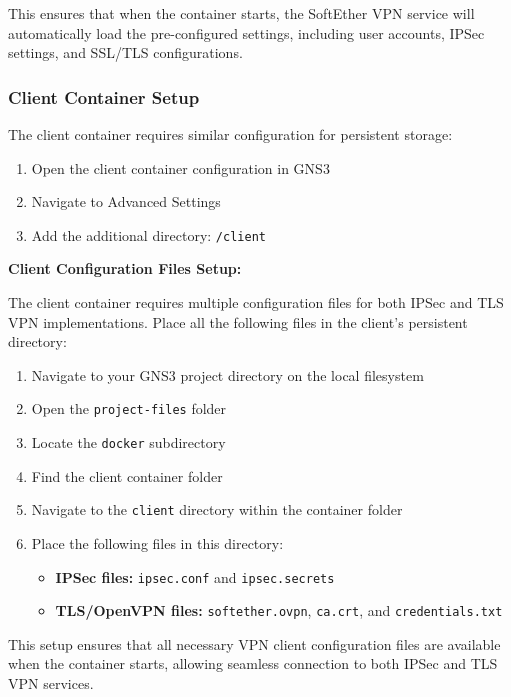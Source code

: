 \noindent
This ensures that when the container starts, the SoftEther VPN service will automatically load the pre-configured settings, including user accounts, IPSec settings, and SSL/TLS configurations.

\subsubsection{Client Container Setup}

The client container requires similar configuration for persistent storage:

\begin{enumerate}
    \item Open the client container configuration in GNS3
    \item Navigate to Advanced Settings  
    \item Add the additional directory: \texttt{/client}
\end{enumerate}

\noindent
\textbf{Client Configuration Files Setup:}

\noindent
The client container requires multiple configuration files for both IPSec and TLS VPN implementations. Place all the following files in the client's persistent directory:

\begin{enumerate}
    \item Navigate to your GNS3 project directory on the local filesystem
    \item Open the \texttt{project-files} folder
    \item Locate the \texttt{docker} subdirectory
    \item Find the client container folder
    \item Navigate to the \texttt{client} directory within the container folder
    \item Place the following files in this directory:
    \begin{itemize}
        \item \textbf{IPSec files:} \texttt{ipsec.conf} and \texttt{ipsec.secrets}
        \item \textbf{TLS/OpenVPN files:} \texttt{softether.ovpn}, \texttt{ca.crt}, and \texttt{credentials.txt}
    \end{itemize}
\end{enumerate}

\noindent
This setup ensures that all necessary VPN client configuration files are available when the container starts, allowing seamless connection to both IPSec and TLS VPN services.

